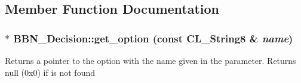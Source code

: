 \subsection{Member Function Documentation}
\hypertarget{classBBN__Decision_af9e18c8e8e86f2e8e989928c8066a92c}{
\subsubsection[{get\_\-option}]{ $\ast$ BBN\_\-Decision::get\_\-option (const CL\_\-String8 \& {\em name})}}
\label{classBBN__Decision_af9e18c8e8e86f2e8e989928c8066a92c}
Returns a pointer to the option with the name given in the parameter. Returns null (0x0) if is not found

